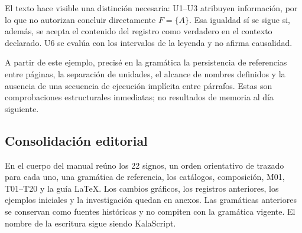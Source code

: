 El texto hace visible una distinción necesaria: U1--U3 atribuyen información,
por lo que no autorizan concluir directamente \(F=\{A\}\). Esa igualdad sí
se sigue si, además, se acepta el contenido del registro como verdadero en
el contexto declarado. U6 se evalúa con los intervalos de la leyenda y no
afirma causalidad.

A partir de este ejemplo, precisé en la gramática la persistencia de referencias entre páginas,
la separación de unidades, el alcance de nombres definidos y la ausencia de
una secuencia de ejecución implícita entre párrafos. Estas son comprobaciones
estructurales inmediatas; no resultados de memoria al día siguiente.



\subsection{Consolidación editorial}
En el cuerpo del manual reúno los 22 signos, un orden orientativo de
trazado para cada uno, una gramática de referencia, los catálogos,
composición, M01, T01--T20 y la guía LaTeX. Los cambios gráficos, los registros
anteriores, los ejemplos iniciales y la investigación quedan en anexos.
Las gramáticas anteriores se conservan como fuentes históricas y no compiten
con la gramática vigente. El nombre de la escritura sigue siendo KalaScript.
